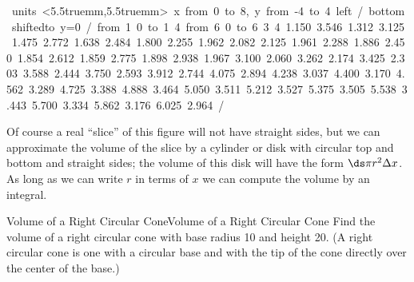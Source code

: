 \figure[H]
\centerline{
\vbox{\hbox{\hfill{}\vbox{
\beginpicture
\normalgraphs
\setcoordinatesystem units <5.5truemm,5.5truemm>
\setplotarea x from 0 to 8, y from -4 to 4
\axis left /
\axis bottom shiftedto y=0 / 
\putrule from 1 0 to 1 4 
\putrule from 6 0 to 6 3
 4 1.150 3.546 
1.312 3.125 1.475 2.772 1.638 2.484 1.800 2.255 1.962 2.082 
2.125 1.961 2.288 1.886 2.450 1.854 2.612 1.859 2.775 1.898 
2.938 1.967 3.100 2.060 3.262 2.174 3.425 2.303 3.588 2.444 
3.750 2.593 3.912 2.744 4.075 2.894 4.238 3.037 4.400 3.170 
4.562 3.289 4.725 3.388 4.888 3.464 5.050 3.511 5.212 3.527 
5.375 3.505 5.538 3.443 5.700 3.334 5.862 3.176 6.025 2.964 /
\endpicture}
\quad{}
\quad{}
\hfill}\vglue-0pt}}
\caption{\label{fig:solid of rotation} A solid of rotation.}
\endfigure

Of course a real ``slice'' of this figure will not have straight
sides, but we can approximate the volume of the slice by a cylinder or
disk with circular top and bottom and straight sides; the volume of
this disk will have the form $\ds \pi r^2\Delta x$. As long as we can
write $r$ in terms of $x$ we can compute the volume by an integral.

\begin{example}{Volume of a Right Circular Cone}{Volume of a Right Circular Cone}\label{Volume of a Right Circular Cone}
Find the volume of a right circular cone with base radius 10 and
height 20. (A right circular cone is one with a circular base and with
the tip of the cone directly over the center of the base.)
\end{example}

